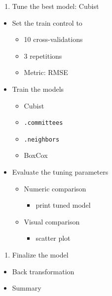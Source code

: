 \documentclass[]{book}
\providecommand{\tightlist}{%
  \setlength{\itemsep}{0pt}\setlength{\parskip}{0pt}}
\begin{document}
\begin{enumerate}
\def\labelenumi{\arabic{enumi}.}
\setcounter{enumi}{9}
\tightlist
\item
  Tune the best model: Cubist
\end{enumerate}

\begin{itemize}
\tightlist
\item
  Set the train control to

  \begin{itemize}
  \tightlist
  \item
    10 cross-validations
  \item
    3 repetitions
  \item
    Metric: RMSE
  \end{itemize}
\item
  Train the models

  \begin{itemize}
  \tightlist
  \item
    Cubist
  \item
    \texttt{.committees}
  \item
    \texttt{.neighbors}
  \item
    BoxCox
  \end{itemize}
\item
  Evaluate the tuning parameters

  \begin{itemize}
  \tightlist
  \item
    Numeric comparison

    \begin{itemize}
    \tightlist
    \item
      print tuned model
    \end{itemize}
  \item
    Visual comparison

    \begin{itemize}
    \tightlist
    \item
      scatter plot
    \end{itemize}
  \end{itemize}
\end{itemize}

\begin{enumerate}
\def\labelenumi{\arabic{enumi}.}
\setcounter{enumi}{10}
\tightlist
\item
  Finalize the model
\end{enumerate}

\begin{itemize}
\tightlist
\item
  Back transformation
\item
  Summary
\end{itemize}
\end{document}
